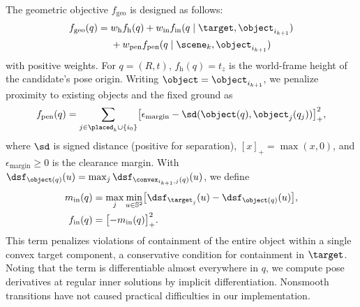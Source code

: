 The geometric objective $f_\mathrm{geo}$ is designed as follows:
\begin{equation*}
  \begin{split}
    f_\mathrm{geo}(q)
    ={} & w_\mathrm{h} f_\mathrm{h}(q) + w_\mathrm{in}f_\mathrm{in}(q \mid \target, \object_{i_{k+1}}) \\
        & + w_\mathrm{pen}f_\mathrm{pen}(q \mid \scene_k, \object_{i_{k+1}})
  \end{split}
\end{equation*}
with positive weights. For $q=(R,t)$, $f_\mathrm{h}(q)=t_z$ is the world-frame height of the candidate's pose origin.
Writing $\object=\object_{i_{k+1}}$, we penalize proximity to existing objects and the fixed ground as
\begin{equation*}
  f_\mathrm{pen}(q)=\sum_{j\in\placed_k\cup\{i_0\}}
  \bigl[\epsilon_\mathrm{margin}-\sd(\object(q),\object_j(q_j))\bigr]_+^2,
\end{equation*}
where $\sd$ is signed distance (positive for separation), $[x]_+=\max(x,0)$, and $\epsilon_\mathrm{margin}\geq0$ is the clearance margin.
With $\dsf_{\object(q)}(u)=\max_j\dsf_{\convex_{i_{k+1},j}(q)}(u)$, we define
\begin{equation*}
  \begin{aligned}
    m_\mathrm{in}(q) & =\max_j\min_{u\in\mathbb{S}^2}\bigl[\dsf_{\target_j}(u)-\dsf_{\object(q)}(u)\bigr], \\
    f_\mathrm{in}(q) & =\bigl[-m_\mathrm{in}(q)\bigr]_+^2.
  \end{aligned}
\end{equation*}
This term penalizes violations of containment of the entire object within a single convex target component, a conservative condition for containment in $\target$.
Noting that the term is differentiable almost everywhere in $q$, we compute pose derivatives at regular inner solutions by implicit differentiation.
Nonsmooth transitions have not caused practical difficulties in our implementation.



